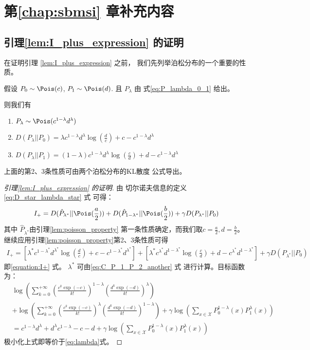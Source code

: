 \chapter{第\ref{chap:sbmsi} 章补充内容}
		
\section{引理\ref{lem:I_plus_expression} 的证明}
在证明引理
\ref{lem:I_plus_expression}  之前，
我们先列举泊松分布的一个重要的性质。
\begin{lemma}\label{lem:poisson_property}
假设 $P_0 \sim \Pois(c)$, $P_1 \sim \Pois(d)$.
且 $P_{\lambda}$ 由 式\eqref{eq:P_lambda_0_1}
给出。

则我们有
\begin{enumerate}
    \item $P_{\lambda} \sim \Pois(c^{1-\lambda} d^{\lambda})$
    \item $D(P_{\lambda}||P_0) = 
    \lambda c^{1-\lambda}d^{\lambda}\log(\frac{d}{c}) + c-c^{1-\lambda}d^{\lambda}$
    \item $D(P_{\lambda}||P_1) = (1-\lambda)
    c^{1-\lambda}d^{\lambda}\log(\frac{c}{d})
    + d-c^{1-\lambda}d^{\lambda}$
\end{enumerate}
\end{lemma}
上面的第2、3条性质可由两个泊松分布的KL散度
公式导出。
\begin{proof}[引理\ref{lem:I_plus_expression} 的证明]
由 切尔诺夫信息的定义 \eqref{eq:D_star_lambda_star} 式
可得：
$$
I_+ = D(\hat{P}_{\lambda^*} || \Pois(\frac{a}{2}))
+ D(\hat{P}_{1-\lambda^*} || \Pois(\frac{b}{2}))
+ \gamma D(P_{\lambda^*} || P_0)
$$
其中 $\hat{P}_{\lambda^*}$由引理\ref{lem:poisson_property}
第一条性质确定，而我们取$c=\frac{a}{2}, d=\frac{b}{2}$。
继续应用引理\ref{lem:poisson_property}第2、3条性质可得
\begin{align*}
    I_+ = \left[\lambda^* c^{1-\lambda^*}d^{\lambda^*}
    \log(\frac{d}{c})+ c-c^{1-\lambda^*}d^{\lambda^*}
    \right]
+ \left[\lambda^* c^{\lambda^*}d^{1-\lambda^*}\log(\frac{c}{d})
+ d - c^{\lambda^*}d^{1-\lambda^*}\right]
+ \gamma D(P_{\lambda^*} || P_0)
\end{align*}
即\eqref{equation:I+} 式。
$\lambda^*$ 可由\eqref{eq:C_P_1_P_2_another} 式
进行计算。目标函数为：
\begin{align*}
&\log\left(\sum_{k=0}^{+\infty} \left(\frac{c^k\exp(-c)}{k!}
\right)^{1-\lambda}
\left(\frac{d^k\exp(-d)}{k!} \right)^{\lambda}
\right) \\
& + \log\left(\sum_{k=0}^{+\infty} \left(\frac{c^k\exp(-c)}{k!}
\right)^{\lambda}
\left(\frac{d^k\exp(-d)}{k!} \right)^{1-\lambda}
\right)+
\gamma\log(\sum_{x\in \mathcal{X}}P^{1-\lambda}_0(x) P^{\lambda}_1(x)
)\\
& = c^{1-\lambda} d^{\lambda} 
+ d^{\lambda} c^{1-\lambda} -c -d +
\gamma\log(\sum_{x\in \mathcal{X}}P^{1-\lambda}_0(x) P^{\lambda}_1(x)
)
\end{align*}
极小化上式即等价于\eqref{eq:lambda}式。
\end{proof}
